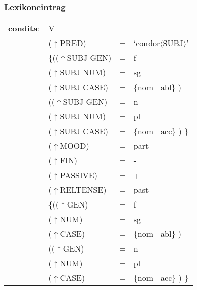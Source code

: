 \documentclass[12pt,a4paper]{article}
\begin{document}
\subsubsection{Lexikoneintrag}

\begin{singlespace}
\begin{tabular}{ l  l  l  l  } 
\textbf{condita}: & \: V \\
$\qquad$ & \:  ($\uparrow$PRED) & = & `condor$\langle$SUBJ$\rangle$'\\
$\qquad$ & \:  \{(($\uparrow$SUBJ GEN) & = & f \\ 
$\qquad$ & \: \: \: ($\uparrow$SUBJ NUM) & = & sg \\
$\qquad$ & \: \: \: ($\uparrow$SUBJ CASE) & = & \{nom $\mid$ abl\} ) $\mid$\\
$\qquad$ & \: \: (($\uparrow$SUBJ GEN) & = & n \\
$\qquad$ & \: \: \: ($\uparrow$SUBJ NUM) & = & pl \\
$\qquad$ & \: \: \: ($\uparrow$SUBJ CASE) & = & \{nom $\mid$ acc\} ) \}\\
$\qquad$ & \:  ($\uparrow$MOOD) & = & part\\
$\qquad$ & \:  ($\uparrow$FIN) & = & - \\
$\qquad$ & \:  ($\uparrow$PASSIVE) & = & + \\
$\qquad$ & \:  ($\uparrow$RELTENSE) & = & past \\
$\qquad$ & \:  \{(($\uparrow$GEN) & = & f \\ 
$\qquad$ & \: \: \: ($\uparrow$NUM) & = & sg \\
$\qquad$ & \: \: \: ($\uparrow$CASE) & = & \{nom $\mid$ abl\} ) $\mid$\\
$\qquad$ & \: \: (($\uparrow$GEN) & = & n \\
$\qquad$ & \: \: \: ($\uparrow$NUM) & = & pl \\
$\qquad$ & \: \: \: ($\uparrow$CASE) & = & \{nom $\mid$ acc\} ) \}\\
\end{tabular}
\newline
\end{singlespace}
\end{document}
